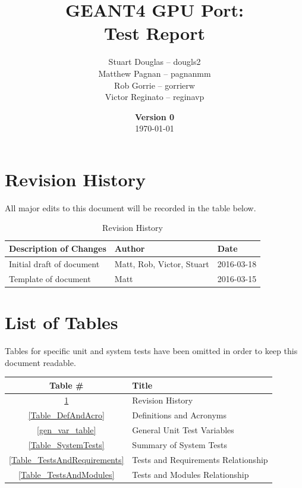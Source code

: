 \documentclass[12pt]{article}
\title{
\LARGE GEANT4 GPU Port:
\\\vspace{10mm}
\large \textbf{Test Report}
\vspace{40mm}
}
\author{
Stuart Douglas -- dougls2
\\Matthew Pagnan -- pagnanmm
\\Rob Gorrie -- gorrierw
\\Victor Reginato -- reginavp
\vspace{10mm}
}
\date{\vfill \textbf{Version 0}\\ \today}
\begin{document}

\maketitle
\newpage

\tableofcontents
\newpage
{}
\restoregeometry

\section*{Revision History}
All major edits to this document will be recorded in the table below.

\begin{table}[h]
\centering
\caption{Revision History}\label{Table_Revision}
\begin{tabular}{lll}
\toprule
\bf Description of Changes & \bf Author & \bf Date\\\midrule
Initial draft of document & Matt, Rob, Victor, Stuart & 2016-03-18\\
Template of document & Matt  & 2016-03-15\\
\bottomrule
\end{tabular}
\end{table}

\section*{List of Tables}
Tables for specific unit and system tests have been omitted in order to keep this document readable.
\begin{center}
\begin{tabular}{cl}
\toprule
\bf Table \# & \bf Title\\\midrule
\ref{Table_Revision} 			& Revision History\\
\ref{Table_DefAndAcro} 			& Definitions and Acronyms\\
\ref{gen_var_table}			& General Unit Test Variables\\
\ref{Table_SystemTests} & Summary of System Tests\\
\ref{Table_TestsAndRequirements}	& Tests and Requirements Relationship\\
\ref{Table_TestsAndModules}		& Tests and Modules Relationship\\
\bottomrule
\end{tabular}
\end{center}
\end{document}
